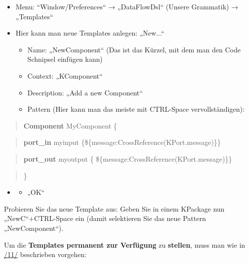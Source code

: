 \documentclass[a4]{article}
\providecommand{\tightlist}{%
  \setlength{\itemsep}{0pt}\setlength{\parskip}{0pt}}
\begin{document}
\begin{itemize}
\item
  Menu: ``Window/Preferences`` → „DataFlowDsl`` (Unsere Grammatik) →
  „Templates``
\item
  Hier kann man neue Templates anlegen: „New...``

  \begin{itemize}
  \tightlist
  \item
    Name: „NewComponent`` (Das ist das Kürzel, mit dem man den Code
    Schnipsel einfügen kann)
  \item
    Context: „KComponent``
  \item
    Description: „Add a new Component``
  \item
    Pattern (Hier kann man das meiste mit CTRL-Space vervollständigen):
  \end{itemize}
\end{itemize}

\begin{quote}
\textbf{Component} MyComponent \{
\end{quote}

\begin{quote}
\textbf{port\_in} myinput
\{\$\{message:CrossReference(KPort.message)\}\}
\end{quote}

\begin{quote}
\textbf{port\_out} myoutput \{
\$\{message:CrossReference(KPort.message)\}\}
\end{quote}

\begin{quote}
\}
\end{quote}

\begin{itemize}
\item
  \begin{itemize}
  \tightlist
  \item
    „OK``
  \end{itemize}
\end{itemize}

Probieren Sie das neue Template aus: Geben Sie in einem KPackage nun
„NewC``+CTRL-Space ein (damit selektieren Sie das neue Pattern
„NewComponent``).

Um die \textbf{Templates permanent zur Verfügung }zu \textbf{stellen},
muss man wie in \protect\hyperlink{anchor-13}{/11/} beschrieben
vorgehen:
\end{document}
